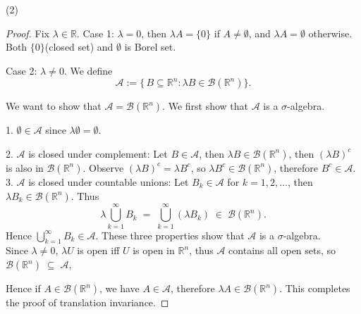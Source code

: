 \documentclass[lang=cn,11pt]{elegantbook}
\begin{document}
(2)
\begin{proof}
Fix \(\lambda \in \mathbb{R}\). 
Case 1: $\lambda = 0$, then $\lambda A = \{ 0\}$ if $A \not = \emptyset$, and $\lambda A = \emptyset$ otherwise. Both $\{0\}$(closed set) and $\emptyset$ is Borel set.

Case 2: $\lambda \not = 0$. We define
\[
\mathcal{A} :=\{\, B \subseteq \mathbb{R}^n :  \lambda B \in \mathcal{B}(\mathbb{R}^n) \}.
\]

We want to show that \(\mathcal{A} = \mathcal{B}(\mathbb{R}^n)\). We first show that $\mathcal{A}$ is a $\sigma$-algebra.

1. \(\emptyset     \in  \mathcal{A}\) since \(\lambda\emptyset = \emptyset\).

2. $\mathcal{A}$ is closed under complement: Let \(B \in \mathcal{A}\), then \(\lambda B \in \mathcal{B}(\mathbb{R}^n)\), then \((\lambda B)^c\) is also in \(\mathcal{B}(\mathbb{R}^n)\). Observe $(\lambda B)^c = \lambda B^c$, so $\lambda B^c \in \mathcal{B}(\mathbb{R}^n)$, therefore $B^c \in \mathcal{A}$.
3. $\mathcal{A}$ is closed under countable unions: Let \(B_k \in \mathcal{A}\) for \(k = 1, 2, \dots\), then \(\lambda B_k \in \mathcal{B}(\mathbb{R}^n)\). Thus
   \[
    \lambda \bigcup_{k=1}^{\infty} B_k
   \;=\;
   \bigcup_{k=1}^{\infty} (\lambda B_k)
   \;\in\;
   \mathcal{B}(\mathbb{R}^n).
   \]
\noindent Hence \(\bigcup_{k=1}^{\infty} B_k \in \mathcal{A}\).
\noindent These three properties show that \(\mathcal{A}\) is a \(\sigma\)-algebra. \\

\noindent Since $\lambda \not = 0$, \(\lambda U\) is open iff \(U\) is open in $\mathbb{R}^n$, thus \(\mathcal{A}\) contains all open sets, so
\(
\mathcal{B}(\mathbb{R}^n) \;\subseteq\; \mathcal{A}
\), 

Hence if \(A\in \mathcal{B}(\mathbb{R}^n)\),  we have \(A  \in  \mathcal{A}\), therefore $\lambda A \in \mathcal{B}(\mathbb{R}^n)$. This completes the proof of translation invariance.
\end{proof}
\end{document}
